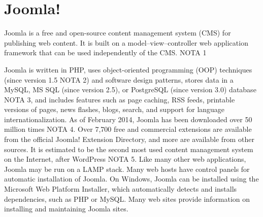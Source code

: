 \section{Joomla!}
\label{sec:CMS_joomla}

Joomla is a free and open-source content management system (CMS) for publishing web content. It is built on a model–view–controller web application framework that can be used independently of the CMS. NOTA 1

Joomla is written in PHP, uses object-oriented programming (OOP) techniques (since version 1.5  NOTA 2) and software design patterns, stores data in a MySQL, MS SQL (since version 2.5), or PostgreSQL (since version 3.0) database NOTA 3, and includes features such as page caching, RSS feeds, printable versions of pages, news flashes, blogs, search, and support for language internationalization.
As of February 2014, Joomla has been downloaded over 50 million times NOTA 4. Over 7,700 free and commercial extensions are available from the official Joomla! Extension Directory, and more are available from other sources. It is estimated to be the second most used content management system on the Internet, after WordPress NOTA 5. 
Like many other web applications, Joomla may be run on a LAMP stack.
Many web hosts have control panels for automatic installation of Joomla. On Windows, Joomla can be installed using the Microsoft Web Platform Installer, which automatically detects and installs dependencies, such as PHP or MySQL.
Many web sites provide information on installing and maintaining Joomla sites.

